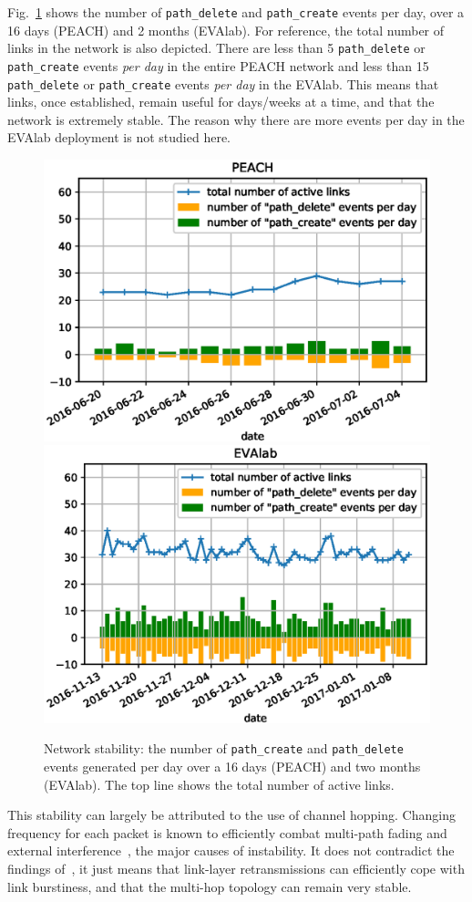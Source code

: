\documentclass{elsarticle}
\newcommand{\pathcreate}          {{\tt path\_create}\xspace}
\newcommand{\pathdelete}          {{\tt path\_delete}\xspace}
\begin{document}

Fig.~\ref{fig:net_churn} shows the number of \pathdelete and \pathcreate events per day, over a 16 days (PEACH) and 2 months (EVAlab).
For reference, the total number of links in the network is also depicted.
There are less than 5 \pathdelete or \pathcreate events \textit{per day} in the entire PEACH network and less than 15 \pathdelete or \pathcreate events \textit{per day} in the EVAlab.
This means that links, once established, remain useful for days/weeks at a time, and that the network is extremely stable.
The reason why there are more events per day in the EVAlab deployment is not studied here.

\begin{figure}
    \includegraphics[width=0.5\columnwidth]{net_churn_peach.eps}
    \includegraphics[width=0.5\columnwidth]{net_churn.eps}
    \caption{
        Network stability: the number of \pathcreate and \pathdelete events generated per day over a 16 days (PEACH) and two months (EVAlab).
        The top line shows the total number of active links.
    }
    \label{fig:net_churn}
\end{figure}


This stability can largely be attributed to the use of channel hopping.
Changing frequency for each packet is known to efficiently combat multi-path fading and external interference~\cite{watteyne09reliability}, the major causes of instability.
It does not contradict the findings of~\cite{srinivasan08beta}, it just means that link-layer retransmissions can efficiently cope with link burstiness, and that the multi-hop topology can remain very stable.
\end{document}
